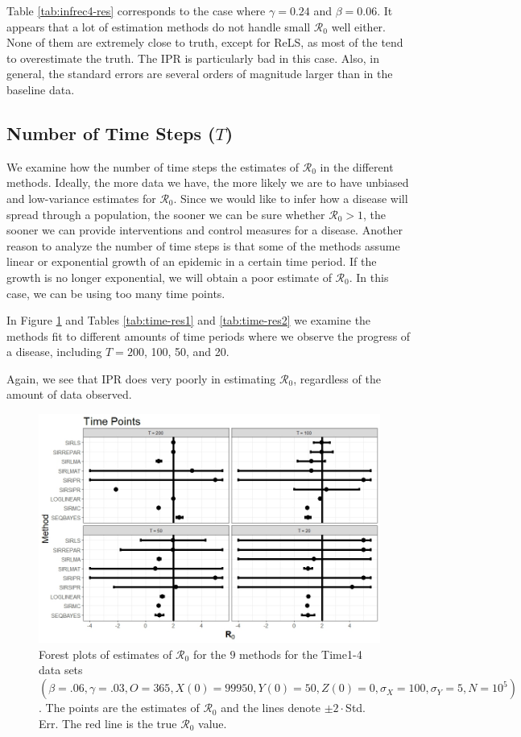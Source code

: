 \documentclass[12pt]{article}
\newcommand{\xxsir}{\ensuremath{9} } %
\newcommand{\rr}{\ensuremath{\mathcal{R}_0}}
\begin{document}
Table \ref{tab:infrec4-res} corresponds to the case where $\gamma = 0.24$ and $\beta=0.06$. It appears that a lot of estimation methods do not handle small $\rr$ well either. None of them are extremely close to truth, except for ReLS, as most of the tend to overestimate the truth. The IPR is particularly bad in this case. Also, in general, the standard errors are several orders of magnitude larger than in the baseline data.


\subsection{Number of Time Steps ($T$)}\label{sec:res-time}
We examine how the number of time steps the estimates of $\rr$ in the different methods.  Ideally, the more data we have, the more likely we are to have unbiased and low-variance estimates for $\rr$.  Since we would like to  infer how a disease will spread through a population, the sooner we can be sure whether $\rr> 1$, the sooner we can provide interventions and control measures for a disease.  Another reason to analyze the number of time steps is that some of the methods assume linear or exponential growth of an epidemic in a certain time period.  If the growth is no longer exponential, we will obtain a poor estimate of $\rr$.  In this case, we can be using too many time points.

In Figure \ref{fig:time-res} and Tables \ref{tab:time-res1} and \ref{tab:time-res2} we examine the methods fit to different amounts of time periods where we observe the progress of a disease, including $T=200$, 100, 50, and 20.

Again, we see that IPR does very poorly in estimating $\rr$, regardless of the amount of data observed.
\begin{figure}[H]
  \centering
  \includegraphics[scale=0.5]{images/time.jpeg}
  \caption{Forest plots of estimates of $\rr$ for the \xxsir methods for the Time1-4 data sets $(\beta=.06, \gamma=.03, O=365, X(0)=99950, Y(0)=50, Z(0)=0, \sigma_X=100, \sigma_Y=5, N=10^5)$.  The points are the estimates of $\rr$ and the lines denote $\pm 2\cdot $Std. Err.  The red line is the true $\rr$ value.}\label{fig:time-res}
  \end{figure}
\end{document}
